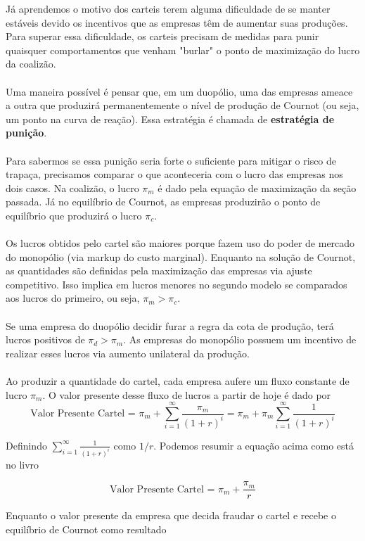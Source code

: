 \documentclass[a4paper,11pt,oneside]{book}
\theoremstyle{definition}
\theoremstyle{break}
\begin{document}
Já aprendemos o motivo dos carteis terem alguma dificuldade de se manter estáveis devido os incentivos que as empresas têm de aumentar suas produções. Para superar essa dificuldade, os carteis precisam de medidas para punir quaisquer comportamentos que venham "burlar" o ponto de maximização do lucro da coalizão.
\\
\\
Uma maneira possível é pensar que, em um duopólio, uma das empresas ameace a outra que produzirá permanentemente o nível de produção de Cournot (ou seja, um ponto na curva de reação). Essa estratégia é chamada de \textbf{estratégia de punição}.
\\
\\
Para sabermos se essa punição seria forte o suficiente para mitigar o risco de trapaça, precisamos comparar o que aconteceria com o lucro das empresas nos dois casos. Na coalizão, o lucro $\pi_m$ é dado pela equação de maximização da seção passada. Já no equilíbrio de Cournot, as empresas produzirão o ponto de equilíbrio que produzirá o lucro $\pi_c$.
\\
\\
Os lucros obtidos pelo cartel são maiores porque fazem uso do poder de mercado do monopólio (via markup do custo marginal). Enquanto na solução de Cournot, as quantidades são definidas pela maximização das empresas via ajuste competitivo. Isso implica em lucros menores no segundo modelo se comparados aos lucros do primeiro, ou seja, $\pi_m > \pi_c$.
\\
\\
Se uma empresa do duopólio decidir furar a regra da cota de produção, terá lucros positivos de $\pi_d > \pi_m$. As empresas do monopólio possuem um incentivo de realizar esses lucros via aumento unilateral da produção.
\\
\\
Ao produzir a quantidade do cartel, cada empresa aufere um fluxo constante de lucro $\pi_m$. O valor presente desse fluxo de lucros a partir de hoje é dado por
$$ \textrm{Valor Presente Cartel = } \pi_m + \displaystyle \sum^{\infty}_{i = 1} \frac{\pi_m}{(1 + r)^i} = \pi_m + \pi_m \displaystyle \sum^{\infty}_{i = 1} \frac{1}{(1 + r)^i} $$

Definindo $\displaystyle \sum^{\infty}_{i = 1} \frac{1}{(1 + r)^i}$ como $1/r$. Podemos resumir a equação acima como está no livro

$$ \textrm{Valor Presente Cartel = } \pi_m + \frac{\pi_m}{r} $$

Enquanto o valor presente da empresa que decida fraudar o cartel e recebe o equilíbrio de Cournot como resultado
\end{document}
